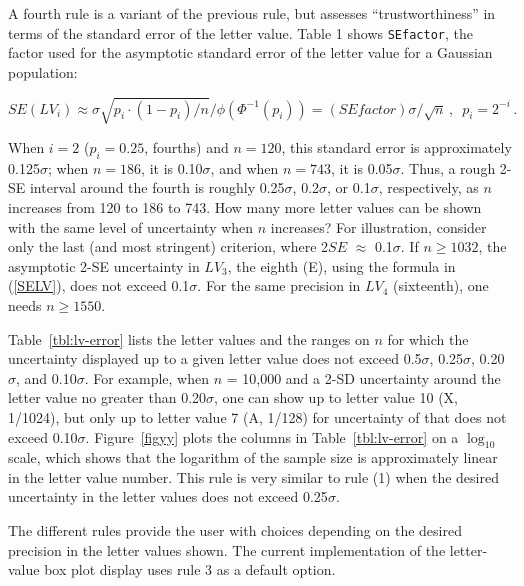 \documentclass[oneside]{article}
\begin{document}

A fourth rule is a variant of the previous rule, but assesses ``trustworthiness'' in terms of the standard error of the letter value. Table 1 shows \texttt{SEfactor}, the factor used for the asymptotic standard error of the letter value for a Gaussian population:

\begin{equation}
SE(LV_i) \approx \sigma \sqrt{p_i \cdot (1 - p_i)/ n} / \phi(\Phi^{-1}(p_i)) 
 = (SEfactor) \sigma / \sqrt{n} \, ,
 \, \, \, p_i = 2^{-i} \, .
\label{SELV}
\end{equation}

\noindent When $i = 2$ ($p_i = 0.25$, fourths) and $n = 120$, this standard error is approximately 0.125$\sigma$; when $n = 186$, it is 0.10$\sigma$, and when $n = 743$, it is 0.05$\sigma$. Thus, a rough 2-SE interval around the fourth is roughly 0.25$\sigma$, 0.2$\sigma$, or 0.1$\sigma$, respectively, as $n$ increases from 120 to 186 to 743. How many more letter values can be shown with the same level of uncertainty when $n$ increases? For illustration, consider only the last (and most stringent) criterion, where 2$SE$ $\approx$ 0.1$\sigma$. If $n \geq 1032$, the asymptotic 2-SE uncertainty in $LV_3$, the eighth (E), using the formula in (\ref{SELV}), does not exceed 0.1$\sigma$. For the same precision in $LV_4$ (sixteenth), one needs $n \geq 1550$.

Table~\ref{tbl:lv-error} lists the letter values and the ranges on $n$ for which the uncertainty displayed up to a given letter value does not exceed 0.5$\sigma$, 0.25$\sigma$, 0.20$\sigma$, and 0.10$\sigma$. For example, when $n$ = 10,000 and a 2-SD uncertainty around the letter value no greater than 0.20$\sigma$, one can show up to letter value 10 (X, 1/1024), but only up to letter value 7 (A, 1/128) for uncertainty of that does not exceed 0.10$\sigma$. Figure~\ref{figyy} plots the columns in Table~\ref{tbl:lv-error} on a $\log_10$ scale, which shows that the logarithm of the sample size is approximately linear in the letter value number. This rule is very similar to rule (1) when the desired uncertainty in the letter values does not exceed 0.25$\sigma$.

The different rules provide the user with choices depending on the desired precision in the letter values shown. The current implementation of the letter-value box plot display uses rule 3 as a default option.
\end{document}
